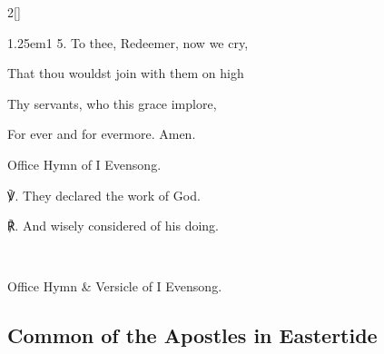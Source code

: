 \begin{paracol}{2}[]
\begin{hangparas}{1.25em}{1}
5. To thee, Redeemer, now we cry,

That thou wouldst join with them on high

Thy servants, who this grace implore,

For ever and for evermore. Amen.
\end{hangparas}


\begin{hymnRubric}
	Office Hymn of I Evensong.\label{ApostlesMattins}
\end{hymnRubric}

℣. They declared the work of God.

℟. And wisely considered of his doing.


\fussy
\end{paracol}

\secondEvensong

\\

\begin{rubric}
	Office Hymn \& Versicle of I Evensong.
\end{rubric}



\clearpage
\subsection{Common of the Apostles in Eastertide}\label{CommonApostlesEaster}

